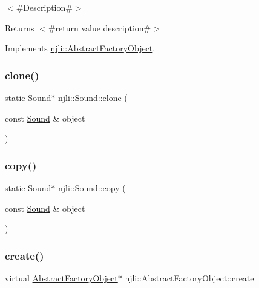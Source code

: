 $<$\#\+Description\#$>$

\begin{DoxyReturn}{Returns}
$<$\#return value description\#$>$ 
\end{DoxyReturn}


Implements \mbox{\hyperlink{classnjli_1_1_abstract_factory_object_a4763d05bc9dc37c559111f8bb30e1dd8}{njli\+::\+Abstract\+Factory\+Object}}.

\mbox{\label{classnjli_1_1_sound_a59f89544f5a6b184f8b19a53a7477000}} 
\subsubsection{\texorpdfstring{clone()}{clone()}}
{\footnotesize\ttfamily static \mbox{\hyperlink{classnjli_1_1_sound}{Sound}}$\ast$ njli\+::\+Sound\+::clone (\begin{DoxyParamCaption}\item[{const \mbox{\hyperlink{classnjli_1_1_sound}{Sound}} \&}]{object }\end{DoxyParamCaption})\hspace{0.3cm}{\ttfamily [static]}}

\mbox{\label{classnjli_1_1_sound_a9ec3756dbe60a666478daf5e2d0a17d8}} 
\subsubsection{\texorpdfstring{copy()}{copy()}}
{\footnotesize\ttfamily static \mbox{\hyperlink{classnjli_1_1_sound}{Sound}}$\ast$ njli\+::\+Sound\+::copy (\begin{DoxyParamCaption}\item[{const \mbox{\hyperlink{classnjli_1_1_sound}{Sound}} \&}]{object }\end{DoxyParamCaption})\hspace{0.3cm}{\ttfamily [static]}}

\mbox{\label{classnjli_1_1_sound_a83a8876ae63b92804004cf3febe76573}} 
\subsubsection{\texorpdfstring{create()}{create()}\hspace{0.1cm}{\footnotesize\ttfamily [1/3]}}
{\footnotesize\ttfamily virtual \mbox{\hyperlink{classnjli_1_1_abstract_factory_object}{Abstract\+Factory\+Object}}$\ast$ njli\+::\+Abstract\+Factory\+Object\+::create}

